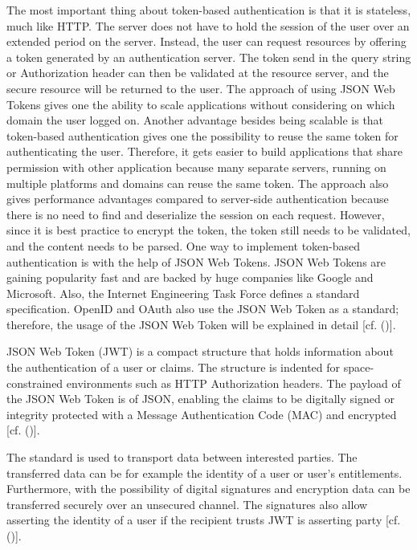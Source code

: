 The most important thing about token-based authentication is that it is stateless, much like HTTP. The server does not have to hold the session of the user over an extended period on the server. Instead, the user can request resources by offering a token generated by an authentication server. The token send in the query string or Authorization header can then be validated at the resource server, and the secure resource will be returned to the user. The approach of using JSON Web Tokens gives one the ability to scale applications without considering on which domain the user logged on. Another advantage besides being scalable is that token-based authentication gives one the possibility to reuse the same token for authenticating the user. Therefore, it gets easier to build applications that share permission with other application because many separate servers, running on multiple platforms and domains can reuse the same token. The approach also gives performance advantages compared to server-side authentication because there is no need to find and deserialize the session on each request. However, since it is best practice to encrypt the token, the token still needs to be validated, and the content needs to be parsed. One way to implement token-based authentication is with the help of JSON Web Tokens. JSON Web Tokens are gaining popularity fast and are backed by huge companies like Google and Microsoft. Also, the Internet Engineering Task Force defines a standard specification. OpenID and OAuth also use the JSON Web Token as a standard; therefore, the usage of the JSON Web Token will be explained in detail [cf. (\cite{Tkalec:2015})].


JSON Web Token (JWT) is a compact structure that holds information about the authentication of a user or claims. The structure is indented for space-constrained environments such as HTTP Authorization headers. The payload of the JSON Web Token is of JSON, enabling the claims to be digitally signed or integrity protected with a Message Authentication Code (MAC) and encrypted [cf. (\cite{JWT:IETF:Jones:2015})].

The standard is used to transport data between interested parties. The transferred data can be for example the identity of a user or user’s entitlements. Furthermore, with the possibility of digital signatures and encryption data can be transferred securely over an unsecured channel. The signatures also allow asserting the identity of a user if the recipient trusts JWT is asserting party [cf. (\cite{Siriwardena:JWTJWSJWE:2016})].

